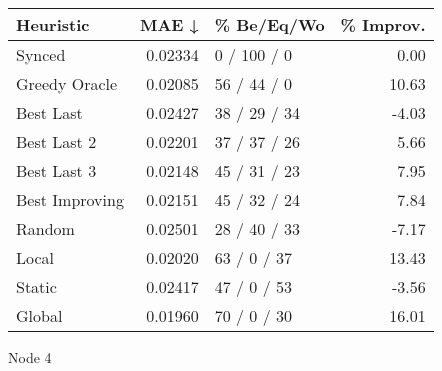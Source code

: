 \begin{tabular}{lrlr}
\toprule
\textbf{Heuristic} & \textbf{MAE ↓} & \textbf{\% Be/Eq/Wo} & \textbf{\% Improv.} \\
\midrule
            Synced &        0.02334 &          0 / 100 / 0 &                0.00 \\
     Greedy Oracle &        0.02085 &          56 / 44 / 0 &               10.63 \\
         Best Last &        0.02427 &         38 / 29 / 34 &               -4.03 \\
       Best Last 2 &        0.02201 &         37 / 37 / 26 &                5.66 \\
       Best Last 3 &        0.02148 &         45 / 31 / 23 &                7.95 \\
    Best Improving &        0.02151 &         45 / 32 / 24 &                7.84 \\
            Random &        0.02501 &         28 / 40 / 33 &               -7.17 \\
             Local &        0.02020 &          63 / 0 / 37 &               13.43 \\
            Static &        0.02417 &          47 / 0 / 53 &               -3.56 \\
            Global &        0.01960 &          70 / 0 / 30 &               16.01 \\
\bottomrule
\end{tabular}
\caption{Node 4}
\label{tab:non_lr05_le2_bs2_4}
